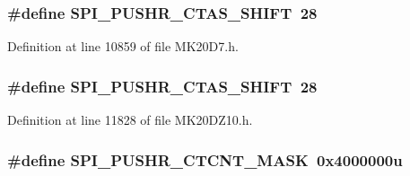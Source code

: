 \subsubsection[{\texorpdfstring{S\+P\+I\+\_\+\+P\+U\+S\+H\+R\+\_\+\+C\+T\+A\+S\+\_\+\+S\+H\+I\+FT}{SPI_PUSHR_CTAS_SHIFT}}]{\setlength{\rightskip}{0pt plus 5cm}\#define S\+P\+I\+\_\+\+P\+U\+S\+H\+R\+\_\+\+C\+T\+A\+S\+\_\+\+S\+H\+I\+FT~28}\hypertarget{group___s_p_i___register___masks_ga16a0810e65793ba9f24a5ae8be8cf49a}{}\label{group___s_p_i___register___masks_ga16a0810e65793ba9f24a5ae8be8cf49a}


Definition at line 10859 of file M\+K20\+D7.\+h.

\subsubsection[{\texorpdfstring{S\+P\+I\+\_\+\+P\+U\+S\+H\+R\+\_\+\+C\+T\+A\+S\+\_\+\+S\+H\+I\+FT}{SPI_PUSHR_CTAS_SHIFT}}]{\setlength{\rightskip}{0pt plus 5cm}\#define S\+P\+I\+\_\+\+P\+U\+S\+H\+R\+\_\+\+C\+T\+A\+S\+\_\+\+S\+H\+I\+FT~28}\hypertarget{group___s_p_i___register___masks_ga16a0810e65793ba9f24a5ae8be8cf49a}{}\label{group___s_p_i___register___masks_ga16a0810e65793ba9f24a5ae8be8cf49a}


Definition at line 11828 of file M\+K20\+D\+Z10.\+h.

\subsubsection[{\texorpdfstring{S\+P\+I\+\_\+\+P\+U\+S\+H\+R\+\_\+\+C\+T\+C\+N\+T\+\_\+\+M\+A\+SK}{SPI_PUSHR_CTCNT_MASK}}]{\setlength{\rightskip}{0pt plus 5cm}\#define S\+P\+I\+\_\+\+P\+U\+S\+H\+R\+\_\+\+C\+T\+C\+N\+T\+\_\+\+M\+A\+SK~0x4000000u}\hypertarget{group___s_p_i___register___masks_gad9e8859d590a59f5e208f5f4a2c8b873}{}\label{group___s_p_i___register___masks_gad9e8859d590a59f5e208f5f4a2c8b873}



